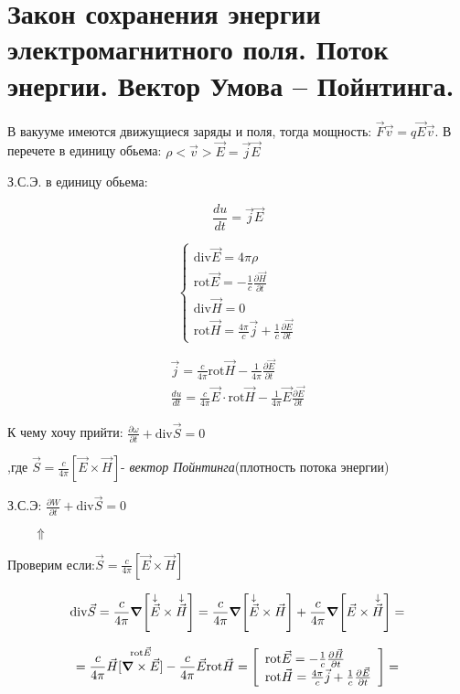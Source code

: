 \section{Закон сохранения энергии электромагнитного поля. Поток энергии. Вектор
Умова – Пойнтинга.}

В вакууме имеются движущиеся заряды и поля, тогда мощность: \( \vec{F}\vec{v}=q\vec{E}\vec{v} \). В перечете в единицу обьема: \( \rho <\vec{v}>\vec{E}=\vec{j}\vec{E} \) 

З.С.Э. в единицу обьема:

\[
\frac{du}{dt}=\vec{j}\vec{E}
\]

\[
\begin{cases}
    \mathrm{div}\vec{E}=4\pi\rho \\
    \mathrm{rot}\vec{E}=-\frac{1}{c} \frac{\partial\vec{H}}{\partial t} \\
    \mathrm{div}\vec{H}=0 \\
    \mathrm{rot}\vec{H}=\frac{4\pi}{c}\vec{j}+\frac{1}{c} \frac{\partial\vec{E}}{\partial t}         
\end{cases}
\]

\begin{gather*}
    \vec{j}=\frac{c}{4\pi}\mathrm{rot}\vec{H}-\frac{1}{4\pi} \frac{\partial \vec{E}}{\partial t} \\
    \frac{du}{dt}=\frac{c}{4\pi}\vec{E}\cdot\mathrm{rot}\vec{H}-\frac{1}{4\pi}\vec{E}\frac{\partial\vec{E}}{\partial t}         
\end{gather*}

К чему хочу прийти: \( \frac{\partial\omega}{\partial t}+\mathrm{div}\vec{S}=0   \) 

,где \( \boxed{\vec{S}=\frac{c}{4\pi}[\vec{E}\times \vec{H}] } \)- \textit{вектор Пойнтинга}(плотность потока энергии)

З.С.Э: \( \frac{\partial W}{\partial t} +\mathrm{div}\vec{S}=0  \)

\(\qquad    \Uparrow\)

Проверим если:\(\vec{S}=\frac{c}{4\pi}[\vec{E}\times \vec{H}] \)

\[
\mathrm{div}\vec{S}=\frac{c}{4\pi}\grad [\overset{\downarrow}{\vec{E}}\times\overset{\downarrow}{\vec{H}} ]=\frac{c}{4\pi}\grad [\overset{\downarrow}{\vec{E}}\times \vec{H}]+\frac{c}{4\pi}\grad[\vec{E}\times \overset{\downarrow}{\vec{H}}]=     
\]

\[
=\frac{c}{4\pi}\vec{H}[\overset{\mathrm{rot}\vec{E} }{\grad \times \vec{E}}]-\frac{c}{4\pi}\vec{E} \mathrm{rot}\vec{H}=
\left[ 
    \begin{array}{ll}
        \mathrm{rot}\vec{E}=-\frac{1}{c}\frac{\partial\vec{H}}{\partial t} \\
        \mathrm{rot}\vec{H}=\frac{4\pi}{c}\vec{j}+\frac{1}{c}\frac{\partial\vec{E}}{\partial t}       
    \end{array} 
\right]=
\]

